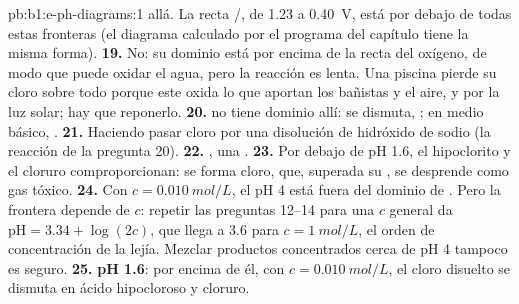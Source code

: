 \begin{solution}{pb:b1:e-ph-diagrams:1}
allá. La recta /, de 1.23 a 0.40~V, está por debajo de
todas estas fronteras (el diagrama calculado por el programa del capítulo
tiene la misma forma).
\textbf{19.} No: su dominio está por encima de la recta del oxígeno, de
modo que puede oxidar el agua, pero la reacción es lenta. Una piscina
pierde su cloro sobre todo porque este oxida lo que aportan los bañistas
y el aire, y por la luz solar; hay que reponerlo.
\textbf{20.}  no tiene dominio allí: se dismuta,
; en medio básico,
.
\textbf{21.} Haciendo pasar cloro por una disolución de hidróxido de
sodio (la reacción de la pregunta 20).
\textbf{22.} , una .
\textbf{23.} Por debajo de pH 1.6, el hipoclorito y el cloruro
comproporcionan: se forma cloro, que, superada su , se
desprende como gas tóxico.
\textbf{24.} Con $c = \qty{0.010}{mol/L}$, el pH 4 está fuera del dominio
de . Pero la frontera depende de $c$: repetir las preguntas
12--14 para una $c$ general da $\mathrm{pH} = 3.34 + \log(2c)$, que llega
a 3.6 para $c = \qty{1}{mol/L}$, el orden de concentración de la lejía.
Mezclar productos concentrados cerca de pH 4 tampoco es seguro.
\textbf{25.} \textbf{pH 1.6}: por encima de él, con
$c = \qty{0.010}{mol/L}$, el cloro disuelto se dismuta en ácido
hipocloroso y cloruro.
\end{solution}
